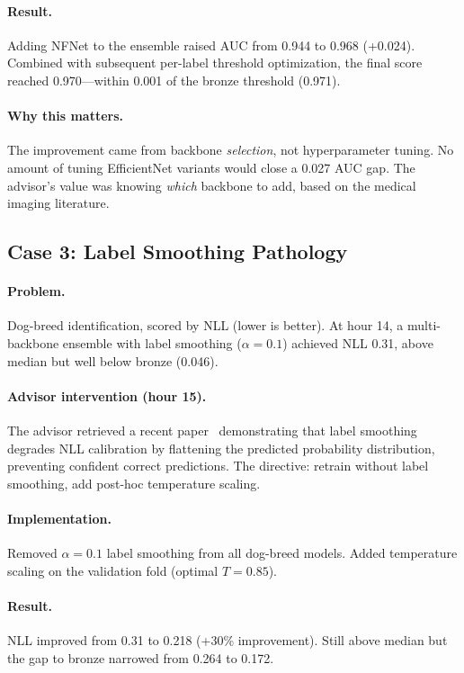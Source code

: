 \documentclass{article}
\begin{document}
\paragraph{Result.} Adding NFNet to the ensemble raised AUC from 0.944 to 0.968 (+0.024). Combined with subsequent per-label threshold optimization, the final score reached 0.970---within 0.001 of the bronze threshold (0.971).

\paragraph{Why this matters.} The improvement came from backbone \emph{selection}, not hyperparameter tuning. No amount of tuning EfficientNet variants would close a 0.027 AUC gap. The advisor's value was knowing \emph{which} backbone to add, based on the medical imaging literature.

\subsection{Case 3: Label Smoothing Pathology}
\label{sec:case_ls}

\paragraph{Problem.} Dog-breed identification, scored by NLL (lower is better). At hour 14, a multi-backbone ensemble with label smoothing ($\alpha = 0.1$) achieved NLL 0.31, above median but well below bronze (0.046).

\paragraph{Advisor intervention (hour 15).} The advisor retrieved a recent paper~\citep{labelsmoothing2025} demonstrating that label smoothing degrades NLL calibration by flattening the predicted probability distribution, preventing confident correct predictions. The directive: retrain without label smoothing, add post-hoc temperature scaling.

\paragraph{Implementation.} Removed $\alpha = 0.1$ label smoothing from all dog-breed models. Added temperature scaling on the validation fold (optimal $T = 0.85$).

\paragraph{Result.} NLL improved from 0.31 to 0.218 (+30\% improvement). Still above median but the gap to bronze narrowed from 0.264 to 0.172.
\end{document}
